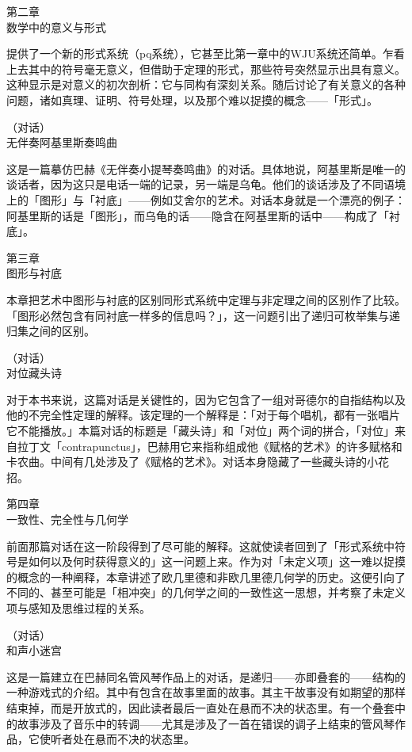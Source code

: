 \documentclass[
  12pt,
  twoside,
  openright,
  oldfontcommands,
]{memoir}
\begin{document}
第二章\\
{数学中的意义与形式}

提供了一个新的形式系统（pq系统），它甚至比第一章中的WJU系统还简单。乍看上去其中的符号毫无意义，但借助于定理的形式，那些符号突然显示出具有意义。这种显示是对意义的初次剖析：它与同构有深刻关系。随后讨论了有关意义的各种问题，诸如真理、证明、符号处理，以及那个难以捉摸的概念------「形式」。

（对话）\\
{无伴奏阿基里斯奏鸣曲}

这是一篇摹仿巴赫《无伴奏小提琴奏鸣曲》的对话。具体地说，阿基里斯是唯一的谈话者，因为这只是电话一端的记录，另一端是乌龟。他们的谈话涉及了不同语境上的「图形」与「衬底」------例如艾舍尔的艺术。对话本身就是一个漂亮的例子：阿基里斯的话是「图形」，而乌龟的话------隐含在阿基里斯的话中------构成了「衬底」。

第三章\\
{图形与衬底}

本章把艺术中图形与衬底的区别同形式系统中定理与非定理之间的区别作了比较。「图形必然包含有同衬底一样多的信息吗？」，这一问题引出了递归可枚举集与递归集之间的区别。

（对话）\\
{对位藏头诗}

对于本书来说，这篇对话是关键性的，因为它包含了一组对哥德尔的自指结构以及他的不完全性定理的解释。该定理的一个解释是：「对于每个唱机，都有一张唱片它不能播放。」本篇对话的标题是「藏头诗」和「对位」两个词的拼合，「对位」来自拉丁文「contrapunctus」，巴赫用它来指称组成他《赋格的艺术》的许多赋格和卡农曲。中间有几处涉及了《赋格的艺术》。对话本身隐藏了一些藏头诗的小花招。

第四章\\
{一致性、完全性与几何学}

前面那篇对话在这一阶段得到了尽可能的解释。这就使读者回到了「形式系统中符号是如何以及何时获得意义的」这一问题上来。作为对「未定义项」这一难以捉摸的概念的一种阐释，本章讲述了欧几里德和非欧几里德几何学的历史。这便引向了不同的、甚至可能是「相冲突」的几何学之间的一致性这一思想，并考察了未定义项与感知及思维过程的关系。

（对话）\\
{和声小迷宫}

这是一篇建立在巴赫同名管风琴作品上的对话，是递归------亦即叠套的------结构的一种游戏式的介绍。其中有包含在故事里面的故事。其主干故事没有如期望的那样结束掉，而是开放式的，因此读者最后一直处在悬而不决的状态里。有一个叠套中的故事涉及了音乐中的转调------尤其是涉及了一首在错误的调子上结束的管风琴作品，它使听者处在悬而不决的状态里。
\end{document}
